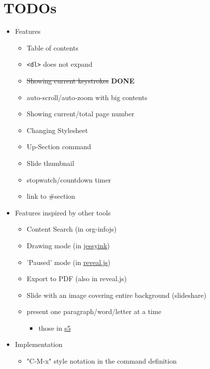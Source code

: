 \section{TODOs}
\label{sec-11}


\begin{container-fluid}
\begin{row-fluid}
\begin{span6}
\begin{smaller}
\begin{itemize}
\item Features
\begin{itemize}
\item Table of contents
\item \texttt{<dl>} does not expand
\item \sout{Showing current keystrokes} \textbf{DONE}
\item auto-scroll/auto-zoom with big contents
\item Showing current/total page number
\item Changing Stylesheet
\item Up-Section command
\item Slide thumbnail
\item stopwatch/countdown timer
\item link to \#section
\end{itemize}
\end{itemize}
\end{smaller}
\end{span6}
\begin{span6}
\begin{smaller}
\begin{itemize}
\item Features inspired by other tools
\begin{itemize}
\item Content Search (in org-infojs)
\item Drawing mode (in \href{http://code.google.com/p/jessyink/}{jessyink})
\item 'Paused' mode (in \href{http://lab.hakim.se/reveal-js/}{reveal.js})
\item Export to PDF (also in reveal.js)
\item Slide with an image covering entire background (slideshare)
\item present one paragraph/word/letter at a time
\begin{itemize}
\item those in \href{http://docutils.sourceforge.net/docs/user/slide-shows.s5.html}{s5}
\end{itemize}
\end{itemize}
\item Implementation
\begin{itemize}
\item "C-M-x" style notation in the command definition
\end{itemize}
\end{itemize}
\end{smaller}
\end{span6}
\end{row-fluid}
\end{container-fluid}
